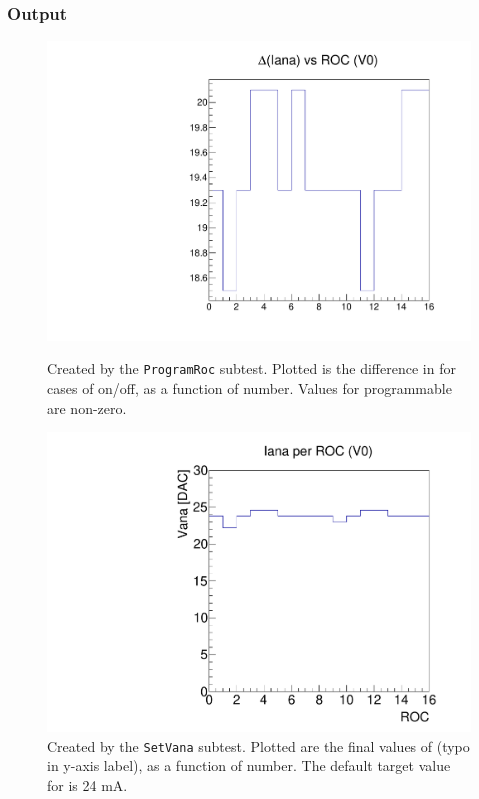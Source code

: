 \subsubsection{Output}

\begin{figure}[!Hp]
\centering
\begin{minipage}{0.45\textwidth}
  \includegraphics[width=1.0\textwidth]{figures/pretest_programROC.pdf}
  \caption{Created by the {\tt ProgramRoc} subtest. 
    Plotted is the difference in \iana for cases of \vana on/off, as a function of \roc number.
    Values for programmable \rocs are non-zero.}
  \label{fig:pretest_programROC}
\end{minipage}
\hspace{0.3cm}
\begin{minipage}{0.45\textwidth}
  \includegraphics[width=1.0\textwidth]{figures/pretest_Iana.pdf}
  \caption{Created by the {\tt SetVana} subtest.  
    Plotted are the final values of \iana (typo in y-axis label), as a function of \roc number.
    The default target value for \iana is 24 mA.}
  \label{fig:pretest_Iana}
\end{minipage}
\end{figure}

